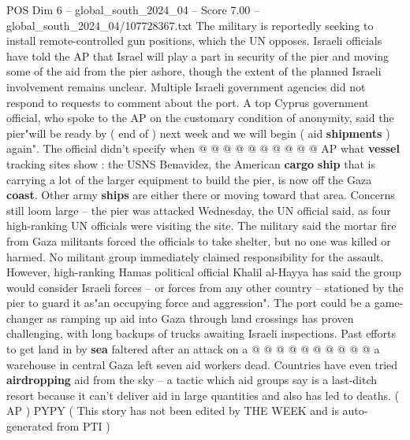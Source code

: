 \begin{textsample}{POS Dim 6 – global\_south\_2024\_04 – Score 7.00 – global\_south\_2024\_04/107728367.txt}
The military is reportedly seeking to install remote-controlled gun positions, which the UN opposes.
Israeli officials have told the AP that Israel will play a part in security of the pier and moving some of the aid from the pier ashore, though the extent of the planned Israeli involvement remains unclear.
Multiple Israeli government agencies did not respond to requests to comment about the port.
A top Cyprus government official, who spoke to the AP on the customary condition of anonymity, said the pier"will be ready by ( end of ) next week and we will begin ( aid \textbf{shipments} ) again".
The official didn't specify when @ @ @ @ @ @ @ @ @ @ AP what \textbf{vessel} tracking sites show : the USNS Benavidez, the American \textbf{cargo} \textbf{ship} that is carrying a lot of the larger equipment to build the pier, is now off the Gaza \textbf{coast}.
Other army \textbf{ships} are either there or moving toward that area.
Concerns still loom large -- the pier was attacked Wednesday, the UN official said, as four high-ranking UN officials were visiting the site.
The military said the mortar fire from Gaza militants forced the officials to take shelter, but no one was killed or harmed.
No militant group immediately claimed responsibility for the assault.
However, high-ranking Hamas political official Khalil al-Hayya has said the group would consider Israeli forces -- or forces from any other country -- stationed by the pier to guard it as"an occupying force and aggression".
The port could be a game-changer as ramping up aid into Gaza through land crossings has proven challenging, with long backups of trucks awaiting Israeli inspections.
Past efforts to get land in by \textbf{sea} faltered after an attack on a @ @ @ @ @ @ @ @ @ @ a warehouse in central Gaza left seven aid workers dead.
Countries have even tried \textbf{airdropping} aid from the sky -- a tactic which aid groups say is a last-ditch resort because it can't deliver aid in large quantities and also has led to deaths. ( AP ) PYPY ( This story has not been edited by THE WEEK and is auto-generated from PTI )

\end{textsample}
